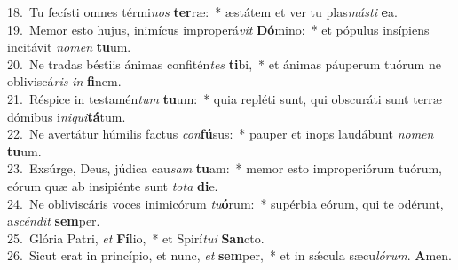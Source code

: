 {18.~}Tu fecísti omnes térmi\textit{nos} \textbf{ter}ræ:~* æstátem et ver tu plas\textit{má}\textit{sti} \textbf{e}a.\\
{19.~}Memor esto hujus, inimícus improperá\textit{vit} \textbf{Dó}mino:~* et pópulus insípiens incitávit \textit{no}\textit{men} \textbf{tu}um.\\
{20.~}Ne tradas béstiis ánimas confitén\textit{tes} \textbf{ti}bi,~* et ánimas páuperum tuórum ne obliviscá\textit{ris} \textit{in} \textbf{fi}nem.\\
{21.~}Réspice in testamén\textit{tum} \textbf{tu}um:~* quia repléti sunt, qui obscuráti sunt terræ dómibus i\textit{ni}\textit{qui}\textbf{tá}tum.\\
{22.~}Ne avertátur húmilis factus \textit{con}\textbf{fú}sus:~* pauper et inops laudábunt \textit{no}\textit{men} \textbf{tu}um.\\
{23.~}Exsúrge, Deus, júdica cau\textit{sam} \textbf{tu}am:~* memor esto improperiórum tuórum, eórum quæ ab insipiénte sunt \textit{to}\textit{ta} \textbf{di}e.\\
{24.~}Ne obliviscáris voces inimicórum \textit{tu}\textbf{ó}rum:~* supérbia eórum, qui te odérunt, a\textit{scén}\textit{dit} \textbf{sem}per.\\
{25.~}Glória Patri, \textit{et} \textbf{Fí}lio,~* et Spirí\textit{tu}\textit{i} \textbf{San}cto.\\
{26.~}Sicut erat in princípio, et nunc, \textit{et} \textbf{sem}per,~* et in sǽcula sæcu\textit{ló}\textit{rum}. \textbf{A}men.\\
